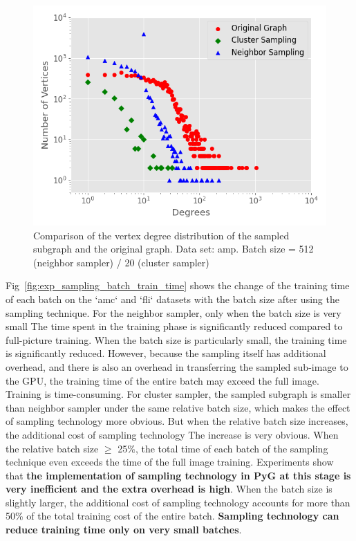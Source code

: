 {\begin{figure}
    \centering
    \includegraphics[width=0.7\columnwidth]{figs/experiments/exp_sampling_minibatch_degrees_distribution_amazon-photo.png}
    \caption{Comparison of the vertex degree distribution of the sampled subgraph and the original graph. Data set: amp. Batch size = 512 (neighbor sampler) / 20 (cluster sampler)}
    \label{fig:exp_sampling_minibatch_degrees_distribution}
\end{figure}

Fig~\ref{fig:exp_sampling_batch_train_time} shows the change of the training time of each batch on the `amc` and `fli` datasets with the batch size after using the sampling technique.
For the neighbor sampler, only when the batch size is very small The time spent in the training phase is significantly reduced compared to full-picture training. 
When the batch size is particularly small, the training time is significantly reduced. However, because the sampling itself has additional overhead, 
and there is also an overhead in transferring the sampled sub-image to the GPU, the training time of the entire batch may exceed the full image. 
Training is time-consuming. For cluster sampler, the sampled subgraph is smaller than neighbor sampler under the same relative batch size,
which makes the effect of sampling technology more obvious. But when the relative batch size increases, 
the additional cost of sampling technology The increase is very obvious. When the relative batch size $\geq$ 25\%,
the total time of each batch of the sampling technique even exceeds the time of the full image training. 
Experiments show that \textbf{the implementation of sampling technology in PyG at this stage is very inefficient and the extra overhead is high}.
When the batch size is slightly larger, the additional cost of sampling technology accounts for more than 50\% of the total training cost of the entire batch.
\textbf{Sampling technology can reduce training time only on very small batches}.

}

